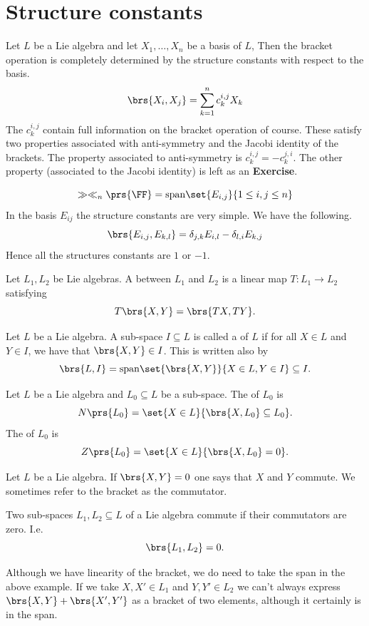 \documentclass[10pt,a4paper,twoside,openany,hidelinks]{book}
\begin{document}
\section{Structure constants}
Let $L$ be a Lie algebra and let $X_1, \ldots, X_n$ be a basis of $L$, Then the bracket operation is completely determined by the structure constants with respect to the basis.
\[\brs{X_i, X_j} = \sum_{k=1}^n c_k^{i,j} X_k\]
The  $c_k^{i,j}$ contain full information on the bracket operation of course. These satisfy two properties associated with anti-symmetry and the Jacobi identity of the brackets.
The property associated to anti-symmetry is $c_k^{i,j} = -c_k^{j,i}$. The other property (associated to the Jacobi identity) is left as an \textbf{\textrm{Exercise}}.
\begin{example}
\[\gg \ll_n\prs{\FF} = \mathrm{span}\set{E_{i,j}}{1 \leq i,j\leq n}\]
In the basis $E_{ij}$ the structure constants are very simple. We have the following.
\[\brs{E_{i,j}, E_{k,l}} = \delta_{j,k}E_{i,l} - \delta_{l,i}E_{k,j}\]
Hence all the structures constants are $1$ or $-1$.
\end{example}
\begin{definition}
Let $L_1, L_2$ be Lie algebras. A  between $L_1$ and $L_2$ is a linear map $T \colon L_1 \to L_2$ satisfying
\[T\brs{X,Y} = \brs{TX, TY}\text{.}\]
\end{definition}
\begin{definition}
Let $L$ be a Lie algebra. A sub-space $I \subseteq L$ is called a  of $L$ if for all $X \in L$ and $Y \in I$, we have that $\brs{X,Y} \in I$. This is written also by 
\[\brs{L,I} = \mathrm{span}\set{\brs{X,Y}}{X \in L, Y \in I} \subseteq I \text{.}\]
\end{definition}
\begin{definition}
Let $L$ be a Lie algebra and $L_0 \subseteq L$ be a sub-space. The  of $L_0$ is
\[N\prs{L_0} = \set{X \in L}{\brs{X,L_0} \subseteq L_0}\text{.}\]
The  of $L_0$ is
\[Z\prs{L_0} = \set{X \in L}{\brs{X,L_0} = 0} \text{.}\]
\end{definition}
\begin{definition}
Let $L$ be a Lie algebra. If $\brs{X,Y} = 0$ one says that $X$ and $Y$ commute.
We sometimes refer to the bracket as the commutator.
\end{definition}
\begin{example}
Two sub-spaces $L_1, L_2 \subseteq L$ of a Lie algebra commute if their commutators are zero. I.e.
\[\brs{L_1, L_2} = 0 \text{.}\]
\end{example}
\begin{remark}
Although we have linearity of the bracket, we do need to take the span in the above example. If we take $X,X' \in L_1$ and $Y,Y' \in L_2$ we can't always express $\brs{X,Y} + \brs{X',Y'}$ as a bracket of two elements, although it certainly is in the span.
\end{remark}
\end{document}
